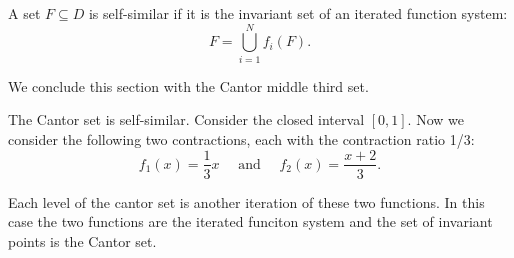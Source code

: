 \begin{definition}
    A set $F\subseteq D$ is self-similar if it is the invariant set of an iterated function system:
    $$F = \bigcup_{i=1}^N f_i(F).$$
\end{definition}
We conclude this section with the Cantor middle third set.  
\begin{example}
    The Cantor set is self-similar.  Consider the closed interval $[0,1]$.  Now we consider the following two contractions, each with the contraction ratio 1/3: 
    $$f_1 (x) = \frac{1}{3}x \quad \text{ and } \quad f_2 (x) = \frac{x+2}{3}.$$

    Each level of the cantor set is another iteration of these two functions.  In this case the two functions are the iterated funciton system and the set of invariant points is the Cantor set.  
\end{example}